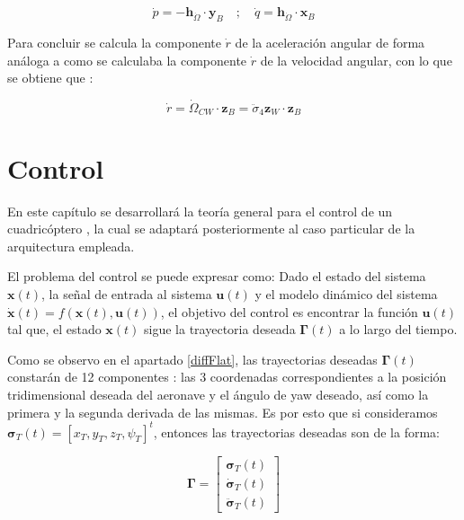 \begin{equation}
	\dot p = -\textbf{h}_{\dot \Omega} \cdot \mathbf{y}_B \quad;\quad \dot q = \textbf{h}_{\dot \Omega}  \cdot \mathbf{x}_B
\end{equation}

Para concluir se calcula la componente $\dot{r}$ de la aceleración angular de forma análoga a como se calculaba la componente $\dot{r}$ de la velocidad angular, con lo que se obtiene que :

\begin{equation}
	 \dot r = \dot\Omega_{CW} \cdot \mathbf{z}_B =  \ddot \sigma_4 \mathbf{z}_W \cdot \mathbf{z}_B
	\end{equation}


\chapter{Control}
En este capítulo se desarrollará la teoría general para el control de un cuadricóptero \cite{MinimunSnap2011}\cite{mahony2012multirotor}\cite{amir2008modeling}\cite{mellinger2012trajectory}, la cual se adaptará posteriormente al caso particular de la arquitectura empleada.

El problema del control se puede expresar como: 
Dado el estado del sistema $\mathbf{x}(t)$, la señal de entrada al sistema $\mathbf{u}(t)$ y el modelo dinámico del sistema $ \mathbf{\dot x}(t) = f(\mathbf{x}(t),\mathbf{u}(t))$, el objetivo del control es encontrar la función $\mathbf{u}(t)$ tal que, el estado $\mathbf{x}(t)$ sigue la trayectoria deseada $\mathbf{\Gamma}(t)$ a lo largo del tiempo.

 Como se observo en el apartado \ref{diffFlat}, las trayectorias deseadas $\mathbf{\Gamma}(t)$ constarán de 12 componentes : las 3 coordenadas correspondientes a la posición tridimensional deseada del aeronave y el ángulo de yaw deseado, así como la primera y la segunda derivada de las mismas. Es por esto que si consideramos $\mathbf{\sigma}_{T}(t) = [x_{T},y_{T},z_{T}, \psi_{T}]^t$, entonces las trayectorias deseadas son de la forma:
 
 \begin{equation}
 	\mathbf{\Gamma} = \begin{bmatrix}
 		\mathbf{\sigma}_{T}(t)\\
 		\mathbf{\dot \sigma}_{T}(t)\\
 		\mathbf{\ddot \sigma}_{T}(t)
 	\end{bmatrix}
 \end{equation}


